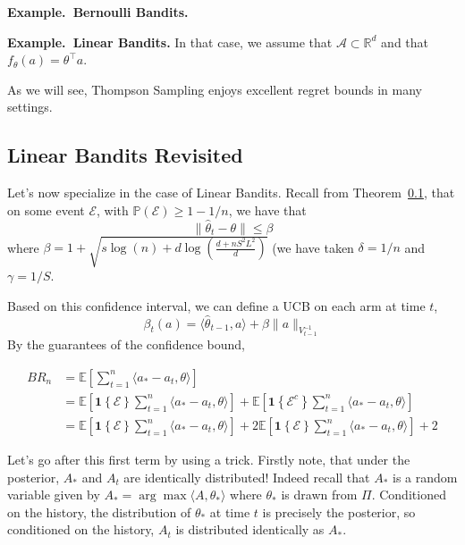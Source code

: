 \documentclass[11pt]{article}
\newcommand{\example}{\noindent\textbf{Example.\  }}
\renewcommand{\P}{\mathbb{P}}
\newcommand{\E}{\mathbb{E}}
\newcommand{\mc}[1]{\mathcal{#1}}
\newcommand{\1}[1]{\mathbf{1}\left\{#1\right\}}
\begin{document}
\example \textbf{Bernoulli Bandits.}

\example \textbf{Linear Bandits.} In that case, we assume that $\mc{A} \subset \mathbb{R}^d$ and  that $f_{\theta}(a) = \theta^{\top} a$.


As we will see, Thompson Sampling enjoys excellent regret bounds in many settings.

\subsection{Linear Bandits Revisited}
Let's now specialize in the case of Linear Bandits. Recall from Theorem~\ref{}, that on some event $\mc{E}$, with $\P(\mc{E})\geq 1-1/n$, we have that
\[\|\hat{\theta}_t - \theta\| \leq \beta\]
where $\beta =  1 + \sqrt{s\log(n) + d\log\left(\frac{d + nS^2L^2}{d}\right)}$ (we have taken $\delta = 1/n$ and $\gamma = 1/S$.

Based on this confidence interval, we can define a UCB on each arm at time $t$, 
\[\beta_t(a) = \langle\hat{\theta}_{t-1}, a\rangle + \beta\|a\|_{V^{-1}_{t-1}}\]
By the guarantees of the confidence bound, 

\begin{align*}
    BR_{n} 
    &= \E[\sum_{t=1}^n \langle a_{\ast} - a_t, \theta \rangle]\\
    &= \E[\1{\mc{E}}\sum_{t=1}^n \langle a_{\ast} - a_t, \theta \rangle]+
       \E[\1{\mc{E}^c}\sum_{t=1}^n \langle a_{\ast} - a_t, \theta \rangle]\\
    &= \E[\1{\mc{E}}\sum_{t=1}^n \langle a_{\ast} - a_t, \theta \rangle] + 2
    \E[\1{\mc{E}}\sum_{t=1}^n \langle a_{\ast} - a_t, \theta \rangle] + 2
\end{align*}

Let's go after this first term by using a trick. Firstly note, that under the posterior, $A_{\ast}$ and $A_t$ are identically distributed! Indeed recall that $A_{\ast}$ is a random variable given by $A_{\ast} = \arg\max \langle A, \theta_{\ast}\rangle$ where $\theta_{\ast}$ is drawn from $\Pi$. Conditioned on the history, the distribution of $\theta_{\ast}$ at time $t$ is precisely the posterior, so conditioned on the history, $A_t$ is distributed identically as $A_{\ast}$. 
\end{document}
